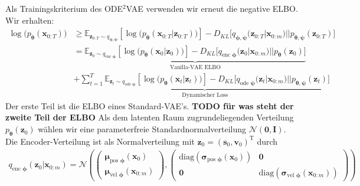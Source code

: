 \documentclass[12pt]{article}
\newcommand{\E}{\mathbb{E}}
\begin{document}
	Als Trainingskriterium des ODE$^2$VAE verwenden wir erneut die negative ELBO.
	Wir erhalten:
	\begin{align*}
	\log\big(p_{\boldsymbol{\theta}}(\mathbf{x}_{0:T})\big)&\ge \E_{\mathbf{z}_{0:T}\sim q_{\boldsymbol\phi,\boldsymbol\psi}}
	\left[\log\big(p_{\boldsymbol\theta}\left(\mathbf{x}_{0:T}|\mathbf{z}_{0:T}\right)\big)\right] - D_{KL}\big[q_{\boldsymbol\phi,\boldsymbol\psi}(\mathbf{z}_{0:T}|\mathbf{x}_{0:m})||p_{\boldsymbol\theta,\boldsymbol\psi}(\mathbf{z}_{0:T})\big]\\
	&=\underbrace{\E_{\mathbf{z}_{0}\sim q_{\text{enc }\boldsymbol\phi}}
		\left[\log\big(p_{\boldsymbol\theta}\left(\mathbf{x}_{0}|\mathbf{z}_{0}\right)\big)\right] - D_{KL}\big[q_{\text{enc }\boldsymbol\phi}(\mathbf{z}_{0}|\mathbf{x}_{0:m})||p_{\boldsymbol\theta}(\mathbf{z}_{0})\big]}_{\text{Vanilla-VAE ELBO}}\\ &+ \underbrace{\sum_{t=1}^T \E_{\mathbf{z}_{t}\sim q_{\text{ode }\boldsymbol\psi}}
		\left[\log\big(p_{\boldsymbol\theta}\left(\mathbf{x}_{t}|\mathbf{z}_{t}\right)\big)\right] - D_{KL}\big[q_{\text{ode }\boldsymbol\psi}(\mathbf{z}_{t}|\mathbf{x}_{0:m})||p_{\boldsymbol\theta,\boldsymbol\psi}(\mathbf{z}_{t})\big]}_{\text{Dynamischer Loss}}
	\end{align*}
	Der erste Teil ist die ELBO eines Standard-VAE's. \textbf{TODO für was steht der zweite Teil der ELBO}
	Als dem latenten Raum zugrundeliegenden Verteilung $p_{\boldsymbol\theta}(\mathbf{z}_{0})$ wählen wir eine parameterfreie Standardnormalverteilung $\mathcal{N}(\mathbf{0},\mathbf{I})$.\\
	Die Encoder-Verteilung ist als Normalverteilung mit $\mathbf{z}_{0} = (\mathbf{s}_{0},\mathbf{v}_{0})^{\mathrm{T}}$ durch
	\begin{align*}
	q_{\text{enc }\boldsymbol\phi}(\mathbf{z}_{0}|\mathbf{x}_{0:m}) =
	\mathcal{N}\left(\left(\begin{array}{cc}
	\boldsymbol\mu_{\text{pos }\boldsymbol\phi}(\textbf{x}_{0}) \\
	\boldsymbol\mu_{\text{vel }\boldsymbol\phi}(\textbf{x}_{0:m})
	\end{array}\right),\left(\begin{array}{cc}
	\text{diag}(\boldsymbol\sigma_{\text{pos }\boldsymbol\phi}(\textbf{x}_{0})) &
	\mathbf{0}\\
	\mathbf{0} &
	\text{diag}(\boldsymbol\sigma_{\text{vel }\boldsymbol\phi}(\textbf{x}_{0:m}))
	\end{array}\right)\right)
	\end{align*}
\end{document}
